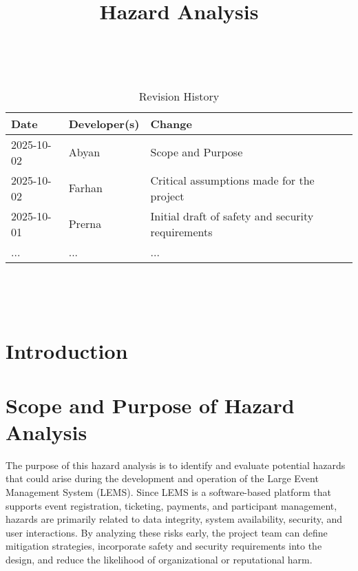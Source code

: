 \documentclass{article}
\title{Hazard Analysis\\\progname}
\author{\authname}
\date{}
\begin{document}
\maketitle
\thispagestyle{empty}

~\newpage


\begin{table}[hp]
\caption{Revision History} \label{TblRevisionHistory}
\begin{tabularx}{\textwidth}{llX}
\toprule
\textbf{Date} & \textbf{Developer(s)} & \textbf{Change}\\
\midrule
2025-10-02 & Abyan & Scope and Purpose\\
2025-10-02 & Farhan & Critical assumptions made for the project\\
2025-10-01 & Prerna & Initial draft of safety and security requirements\\
... & ... & ...\\
\bottomrule
\end{tabularx}
\end{table}

~\newpage

\tableofcontents

~\newpage



\section{Introduction}


\section{Scope and Purpose of Hazard Analysis}


The purpose of this hazard analysis is to identify and evaluate potential hazards that could arise during 
the development and operation of the Large Event Management System (LEMS). Since LEMS is a 
software-based platform that supports event registration, ticketing, payments, and participant 
management, hazards are primarily related to data integrity, system availability, security, and user 
interactions. By analyzing these risks early, the project team can define mitigation strategies, 
incorporate safety and security requirements into the design, and reduce the likelihood of 
organizational or reputational harm.
\end{document}
